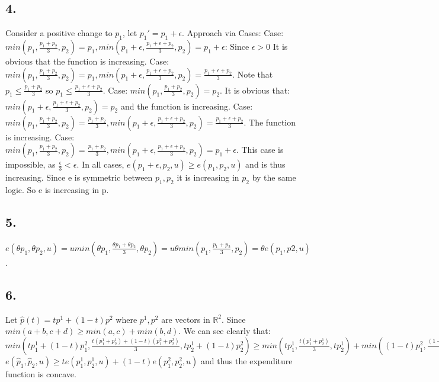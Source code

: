\documentclass[10pt, letterpaper]{paper}
\begin{document}
\subsection*{4.}
Consider a positive change to $p_1$, let $p_1' = p_1 + \epsilon$. Approach via Cases:
\newline
Case: $min( p_1, \frac{p_1+p_2}{3}, p_2 ) = p_1, min( p_1 + \epsilon, \frac{p_1 + \epsilon+p_2}{3}, p_2 ) = p_1 + \epsilon$: Since $\epsilon > 0$ It is obvious that the function is increasing.
\newline
Case: $min( p_1, \frac{p_1+p_2}{3}, p_2 ) = p_1, min( p_1 + \epsilon, \frac{p_1 + \epsilon+p_2}{3}, p_2 ) = \frac{p_1 + \epsilon+p_2}{3}$. Note that $p_1 \leq \frac{p_1 + p_2}{3}$ so $p_1 \leq \frac{p_1 + \epsilon+p_2}{3}$.
\newline
Case: $min( p_1, \frac{p_1+p_2}{3}, p_2 ) = p_2$. It is obvious that: $min( p_1 + \epsilon, \frac{p_1 + \epsilon+p_2}{3}, p_2 ) = p_2$ and the function is increasing.
\newline
Case: $min( p_1, \frac{p_1+p_2}{3}, p_2 ) = \frac{p_1+p_2}{3}, min( p_1 + \epsilon, \frac{p_1 + \epsilon+p_2}{3}, p_2 ) = \frac{p_1 + \epsilon+p_2}{3}$. The function is increasing.
\newline
Case: $min( p_1, \frac{p_1+p_2}{3}, p_2 ) = \frac{p_1+p_2}{3}, min( p_1 + \epsilon, \frac{p_1 + \epsilon+p_2}{3}, p_2 ) = p_1 + \epsilon$. This case is impossible, as $\frac{\epsilon}{3} < \epsilon$. 
\newline
In all cases, $e( p_1 + \epsilon, p_2, u ) \geq e( p_1, p_2, u )$ and is thus increasing. Since e is symmetric between $p_1,p_2$ it is increasing in $p_2$ by the same logic. So e is increasing in p.
\subsection*{5.}
$e( \theta p_1, \theta p_2, u ) = u min( \theta p_1, \frac{ \theta p_1 + \theta p_2 }{3}, \theta p_2 ) = u \theta min( p_1, \frac{ p_1 + p_2 }{3}, p_2 ) = \theta e( p_1, p2, u )$.
\subsection*{6.}
Let $\hat{p}(t) = tp^1 + (1-t)p^2$ where $p^1, p^2$ are vectors in $\mathbb{R}^2$.
\newline
Since $min(a+b,c+d) \geq min(a,c) + min(b,d)$. We can see clearly that:
\newline
$min( t p_1^1 + (1-t)p_1^2, \frac{ t( p_1^1 + p_2^1 ) + (1-t)( p_1^2 + p_2^2) }{3}, t p_2^1 + (1-t)p_2^2 ) \geq min( t p_1^1, \frac{ t( p_1^1 + p_2^1 ) }{3}, tp_2^1 ) + min( (1-t)p_1^2, \frac{ (1-t)( p_2^1 + p_2^2 ) }{3}, (1-t)p_2^2 )$
\newline
$e( \hat p_1, \hat p_2, u ) \geq te( p_1^1, p_2^1, u) + (1-t)e( p_1^2, p_2^2, u )$ and thus the expenditure function is concave. 
\end{document}
